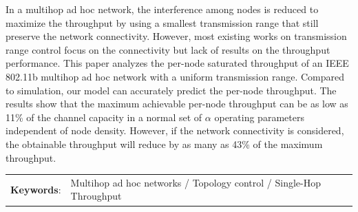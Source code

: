 \abstract

In a multihop ad hoc network, the interference among nodes is
  reduced to maximize the throughput by using a smallest transmission
  range that still preserve the network connectivity. However, most
  existing works on transmission range control focus on the
  connectivity but lack of results on the throughput performance. This
  paper analyzes the per-node saturated throughput of an IEEE 802.11b
  multihop ad hoc network with a uniform transmission range. Compared
  to simulation, our model can accurately predict the per-node
  throughput.  The results show that the maximum achievable per-node
  throughput can be as low as 11\% of the channel capacity in a normal
  set of $\alpha$ operating parameters independent of node density. However, if
  the network connectivity is considered, the obtainable throughput
  will reduce by as many as 43\% of the maximum throughput.

\begin{flushleft}
\begin{tabular*}{\textwidth}{@{}lp{}}
\textbf{Keywords}: & Multihop ad hoc networks / Topology control / Single-Hop Throughput
\end{tabular*}
\end{flushleft}
\endabstract

